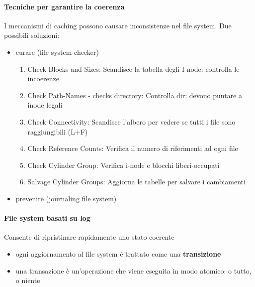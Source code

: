 \documentclass[a4paper,12pt]{article}
\begin{document}
\paragraph{Tecniche per garantire la coerenza}
I meccanismi di caching possono causare inconsistenze nel file system.
Due possibili soluzioni:
\begin{itemize}
  \item curare (file system checker)
  \begin{enumerate}
    \item Check Blocks and Sizes: Scandisce la tabella degli I-node: controlla le incoerenze
    \item Check Path-Names - checks directory: Controlla dir: devono puntare a inode legali
    \item Check Connectivity: Scandisce l’albero per vedere se tutti i file sono raggiungibili
(L+F)
    \item Check Reference Counts: Verifica il numero di riferimenti ad ogni file
    \item Check Cylinder Group: Verifica i-node e blocchi liberi-occupati
    \item Salvage Cylinder Groups: Aggiorna le tabelle per salvare i cambiamenti
  \end{enumerate}
  \item prevenire (journaling file system)
\end{itemize}
\paragraph{File system basati su log} Consente di ripristinare rapidamente uno stato coerente
\begin{itemize}
  \item ogni aggiornamento al file system è trattato come una \textbf{transizione}
  \item una transazione è un'operazione che viene eseguita in modo
atomico: o tutto, o niente
\end{itemize}
\end{document}
